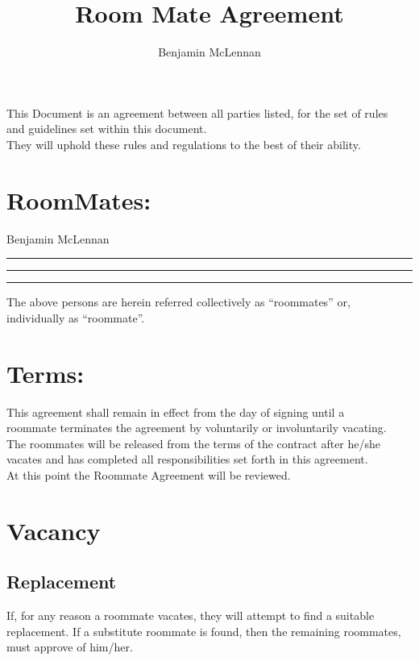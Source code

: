 \documentclass{Article}
\begin{document}
\title{\bfseries{Room Mate Agreement}}
\author{Benjamin McLennan}
\maketitle

\centering{}
This Document is an agreement between all parties listed, for the set of rules\\
and guidelines set within this document. \\
They will uphold these rules and regulations to the best of their ability. \\

\newpage
\flushleft{}
\section{RoomMates:}
\begin{center}
\centerline
\itemize{}
\item Benjamin McLennan 
\item \rule{100pt}{1pt}
\item \rule{100pt}{1pt}
\item \rule{100pt}{1pt}
\end{center}
The above persons are herein referred collectively as ``roommates'' or,\\ individually as ``roommate''.\\ 	
\section{Terms:}
This agreement shall remain in effect from the day of signing until a \\
roommate terminates the agreement by voluntarily or involuntarily vacating.\\
The roommates will be released from the terms of the contract after he/she \\
vacates and has completed all responsibilities set forth in this agreement.\\
At this point the Roommate Agreement will be reviewed.

\section{Vacancy}
\subsection{Replacement}
If, for any reason a roommate vacates, they will attempt to find a suitable \\
replacement. If a substitute roommate is found, then the remaining roommates,\\
must approve of him/her.
\end{document}
